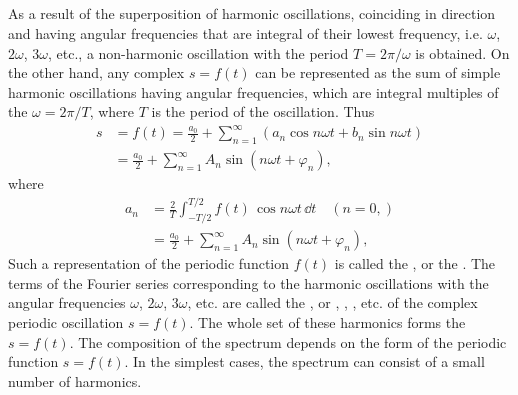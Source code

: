 \subsection{}\label{28.4.6} As a result of the superposition of harmonic oscillations, coinciding in direction and having angular frequencies that are integral  of their lowest frequency, i.e. $\omega$, $2\omega$, $3\omega$, etc., a  non-harmonic oscillation with the period $T = 2\pi/\omega$ is obtained. On the other hand, any complex  $s = f(t)$ can be represented as the sum of simple harmonic oscillations having angular frequencies, which are integral multiples of the   $\omega = 2\pi/T$, where $T$ is the period of the oscillation. Thus 
\begin{align*}%
s & = f(t) = \frac{a_{0}}{2} + \sum_{n = 1}^{\infty} \left( a_{n} \cos n \omega t + b_{n} \sin n \omega t \right)\\
& = \frac{a_{0}}{2} + \sum_{n = 1}^{\infty} A_{n} \sin( n \omega t + \varphi_{n}),
\end{align*}
where
\begin{align*}%
a_{n} & = \frac{2}{T} \int_{-T/2}^{T/2} f(t) \, \cos n \omega t \, \dd t \quad  (n = 0, )\\
& = \frac{a_{0}}{2} + \sum_{n = 1}^{\infty} A_{n} \sin( n \omega t + \varphi_{n}),
\end{align*}
Such a representation of the periodic function $f(t)$ is called the , or the . 
The terms of the Fourier series corresponding to the harmonic oscillations with the angular frequencies $\omega$, $2\omega$, $3\omega$, etc. are called the , or , , , etc.  of the complex periodic oscillation $s = f (t)$. The whole set of these harmonics forms the  $s = f (t)$. The composition of the spectrum depends on the form of the periodic function $s = f (t)$. In the simplest cases, the spectrum can consist of a small number of harmonics. 

